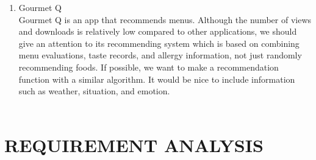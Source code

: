 \documentclass[conference]{IEEEtran}
\begin{document}
\begin{enumerate}
    \item Gourmet Q\\
    Gourmet Q is an app that recommends menus. Although the number of views and downloads is relatively low compared to other applications, we should give an attention to its recommending system which is based on combining menu evaluations, taste records, and allergy information, not just randomly recommending foods. If possible, we want to make a recommendation function with a similar algorithm. It would be nice to include information such as weather, situation, and emotion.\\
    
    \
    \\
\end{enumerate}

\section{REQUIREMENT ANALYSIS}
    
    
\end{document}
